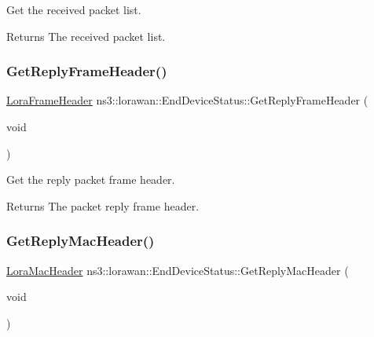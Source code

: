 Get the received packet list.

\begin{DoxyReturn}{Returns}
The received packet list. 
\end{DoxyReturn}
\mbox{\label{classns3_1_1lorawan_1_1EndDeviceStatus_af2095509552ac48da422cbd14f7e975b}} 
\subsubsection{\texorpdfstring{Get\+Reply\+Frame\+Header()}{GetReplyFrameHeader()}}
{\footnotesize\ttfamily \hyperlink{classns3_1_1lorawan_1_1LoraFrameHeader}{Lora\+Frame\+Header} ns3\+::lorawan\+::\+End\+Device\+Status\+::\+Get\+Reply\+Frame\+Header (\begin{DoxyParamCaption}\item[{void}]{ }\end{DoxyParamCaption})}

Get the reply packet frame header.

\begin{DoxyReturn}{Returns}
The packet reply frame header. 
\end{DoxyReturn}
\mbox{\label{classns3_1_1lorawan_1_1EndDeviceStatus_aec276e89a9a780dce296822f3f7b25b9}} 
\subsubsection{\texorpdfstring{Get\+Reply\+Mac\+Header()}{GetReplyMacHeader()}}
{\footnotesize\ttfamily \hyperlink{classns3_1_1lorawan_1_1LoraMacHeader}{Lora\+Mac\+Header} ns3\+::lorawan\+::\+End\+Device\+Status\+::\+Get\+Reply\+Mac\+Header (\begin{DoxyParamCaption}\item[{void}]{ }\end{DoxyParamCaption})}

